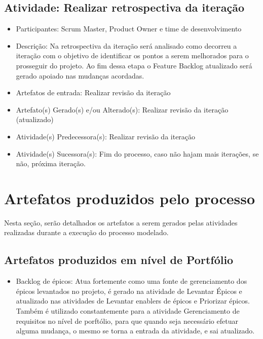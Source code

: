 \subsection{Atividade: Realizar retrospectiva da iteração}
\begin{itemize}
\item Participantes: Scrum Master, Product Owner e time de desenvolvimento

\item Descrição: Na retrospectiva da iteração será analisado como decorreu a iteração com o objetivo de identificar os pontos a serem melhorados para o prosseguir do projeto. Ao fim dessa etapa o Feature Backlog atualizado será gerado apoiado nas mudanças acordadas.

\item Artefatos de entrada: Realizar revisão da iteração

\item Artefato(s) Gerado(s) e/ou Alterado(s): Realizar revisão da iteração (atualizado)

\item Atividade(s) Predecessora(s): Realizar revisão da iteração
  
\item Atividade(s) Sucessora(s): Fim do processo, caso não hajam mais iterações, se não, próxima iteração.
\end{itemize}

\section{Artefatos produzidos pelo processo}

Nesta seção, serão detalhados os artefatos a serem gerados pelas atividades realizadas durante 
a execução do processo modelado.
\subsection{Artefatos produzidos em nível de Portfólio}
\begin{itemize}
\item Backlog de épicos: Atua fortemente como uma fonte de gerenciamento dos épicos levantados no projeto, é gerado na atividade de Levantar Épicos e atualizado nas atividades de Levantar enablers de épicos e Priorizar épicos. Também é utilizado constantemente para a atividade Gerenciamento de requisitos no nível de porftólio, para que quando seja necessário efetuar alguma mudança, o mesmo se torna a entrada da atividade, e sai atualizado.
\end{itemize}



